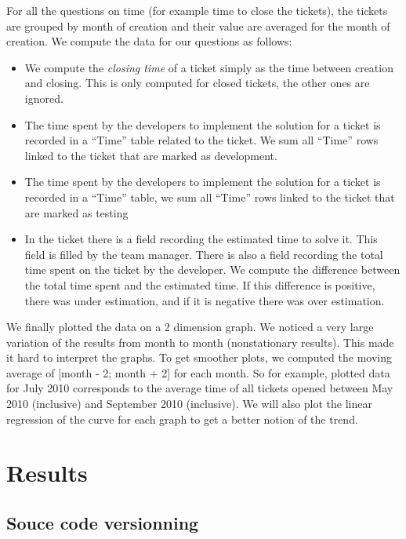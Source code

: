\documentclass[10pt,conference]{IEEEtran}
\begin{document}
For all the questions on time (for example time to close the tickets), the tickets are grouped by month of creation and their value are averaged for the month of creation.  
We compute the data for our questions as follows:
\begin{itemize}
  
  \item We compute the \emph{closing time} of a ticket simply as the time between creation and closing.
  This is only computed for closed tickets, the other ones are ignored.

  \item  The time spent by the developers to implement the solution for a ticket is recorded in a ``Time'' table related to the ticket.
  We sum all ``Time'' rows linked to the ticket that are marked as development.

 \item The time spent by the developers to implement the solution for a ticket is recorded in a ``Time'' table, we sum all ``Time'' rows linked to the ticket that are marked as testing

 \item In the ticket there is a field recording the estimated time to solve it.
 This field is filled by the team manager.
 There is also a field recording the total time spent on the ticket by the developer.
 We compute the difference  between the total time spent and the estimated time.
 If this difference is positive, there was under estimation, and if it is negative there was over estimation.
\end{itemize}

We finally plotted the data on a 2 dimension graph.
We noticed a very large variation of the results from month to month (nonstationary results).
This made it hard to interpret the graphs.
To get smoother plots, we computed the moving average of [month - 2; month + 2] for each month.
So for example, plotted data for July 2010 corresponds to the average time of all tickets opened between May 2010 (inclusive) and September 2010 (inclusive).
We will also plot the linear regression of the curve for each graph to get a better notion of the trend.

\section{Results}

\subsection{Souce code versionning}
\end{document}
